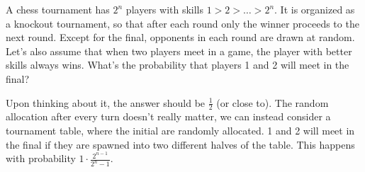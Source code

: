 \begin{qanda} %
    \Q 
    A chess tournament has $2^n$ players with skills $1>2> \dots > 2^n$. It is organized as a knockout tournament, so that after each round only the winner proceeds to the next round. 
    Except for the final, opponents in each round are drawn at random. 
    Let's also assume that when two players meet in a game, the player with better skills always wins.
    What's the probability that players 1 and 2 will meet in the final?

    \A 
    Upon thinking about it, the answer should be $\frac{1}{2}$ (or close to). The random allocation after every turn doesn't really matter, we can instead consider a  tournament table, where the initial  are randomly allocated.
    1 and 2 will meet in the final if they are spawned into two different halves of the table. 
    This happens with probability $1 \cdot \frac{2^{n-1}}{2^n - 1}$.



\end{qanda}


